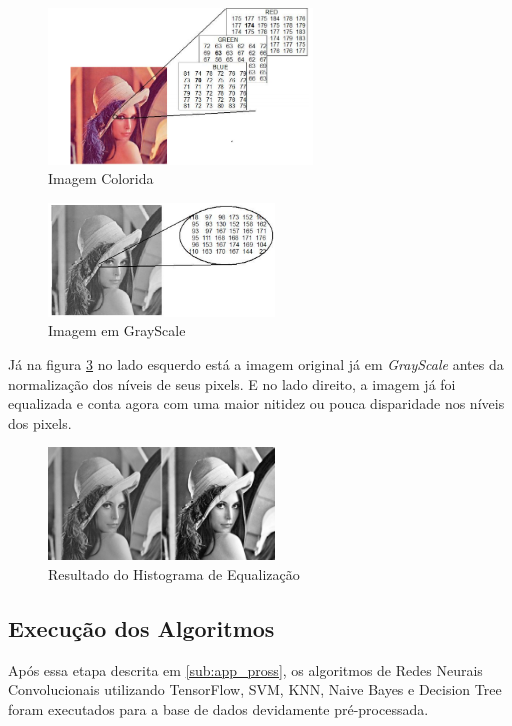 \documentclass{article}
\begin{document}
\begin{figure}[htp]
    \centering
    \includegraphics[width=7cm]{Imagens/colorida.png}
    \caption{Imagem Colorida}
    \label{fig:colorful}
\end{figure}

\begin{figure}[htp]
    \centering
    \includegraphics[width=6cm]{Imagens/gray.png}
    \caption{Imagem em GrayScale}
    \label{fig:gray}
\end{figure}


Já na figura \ref{fig:equal} no lado esquerdo está a imagem original já em \textit{GrayScale} antes da normalização dos níveis de seus pixels. E no lado direito, a imagem já foi equalizada e conta agora com uma maior nitidez ou pouca disparidade nos níveis dos pixels. 

\begin{figure}[h]
    \centering
    \includegraphics[width=6cm]{Imagens/lena_gray_eq-1024x511.png}
    \caption{Resultado do Histograma de Equalização}
    \label{fig:equal}
\end{figure}

\subsection{Execução dos Algoritmos}
\label{sub:alg_ex}
Após essa etapa descrita em \ref{sub:app_pross}, os algoritmos de Redes Neurais Convolucionais utilizando TensorFlow, SVM, KNN, Naive Bayes e Decision Tree foram executados para a base de dados devidamente pré-processada. 
\end{document}
